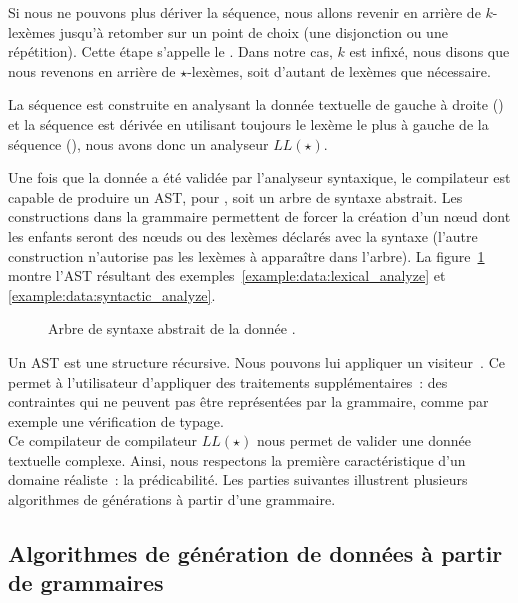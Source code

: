Si nous ne pouvons plus dériver la séquence, nous allons revenir en arrière de
$k$-lexèmes jusqu'à retomber sur un point de choix (une disjonction ou une
répétition). Cette étape s'appelle le . Dans notre cas,
$k$ est infixé, nous disons que nous revenons en arrière de $\star$-lexèmes,
soit d'autant de lexèmes que nécessaire.

La séquence est construite en analysant la donnée textuelle de gauche à droite
() et la séquence est dérivée en utilisant
toujours le lexème le plus à gauche de la séquence (), nous avons donc un analyseur $LL(\star)$.

Une fois que la donnée a été validée par l'analyseur syntaxique, le compilateur
est capable de produire un AST, pour , soit un
arbre de syntaxe abstrait. Les constructions  dans la grammaire
permettent de forcer la création d'un nœud dont les enfants seront des nœuds ou
des lexèmes déclarés avec la syntaxe  (l'autre construction
 n'autorise pas les lexèmes à apparaître dans l'arbre). La
figure~\ref{figure:data:ast} montre l'AST résultant des
exemples~\ref{example:data:lexical_analyze} et
\ref{example:data:syntactic_analyze}.
%
\begin{figure}


\caption{\label{figure:data:ast} Arbre de syntaxe abstrait de la donnée .}

\end{figure}
%
Un AST est une structure récursive. Nous pouvons lui appliquer un {\strong
visiteur}~. Ce  permet à
l'utilisateur d'appliquer des traitements supplémentaires~: des contraintes qui
ne peuvent pas être représentées par la grammaire, comme par exemple une
vérification de typage. \\

Ce compilateur de compilateur $LL(\star)$ nous permet de valider une donnée
textuelle complexe. Ainsi, nous respectons la première caractéristique d'un
domaine réaliste~: la prédicabilité. Les parties suivantes illustrent plusieurs
algorithmes de générations à partir d'une grammaire.

\subsection{Algorithmes de génération de données à partir de grammaires}
\label{subsection:data:algorithms}

